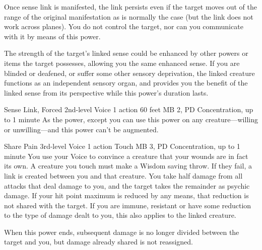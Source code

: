 Once sense link is manifested, the link persists
even if the target moves out of the range
of the original manifestation as is normally the case
(but the link does not work across planes).
You do not control the target,
nor can you communicate with it by means of this power.

The strength of the target's linked sense could be enhanced
by other powers or items the target possesses,
allowing you the same enhanced sense.
If you are blinded or deafened, or suffer some other sensory deprivation,
the linked creature functions as an independent sensory organ,
and provides you the benefit of the linked sense from its perspective
while this power's duration lasts.

\DndPowerHeader%
  {Sense Link, Forced}
  {2nd-level Voice}
  {1 action}
  {60 feet}
  {MB 2, PD \lvltwo}
  {Concentration, up to 1 minute}
As the  power,
except you can use this power on any creature---willing or
unwilling---and this power can't be augmented.

\DndPowerHeader%
  {Share Pain}
  {3rd-level Voice}
  {1 action}
  {Touch}
  {MB 3, PD \lvlthree}
  {Concentration, up to 1 minute}
You use your Voice to convince a creature that your wounds are
in fact its own.
A creature you touch must make a Wisdom saving throw.
If they fail, a link is created between you and that creature.
You take half damage from all attacks that deal damage to you,
and the target takes the remainder as psychic damage.
If your hit point maximum is reduced by any means,
that reduction is not shared with the target.
If you are immune, resistant or have some reduction
to the type of damage dealt to you,
this also applies to the linked creature. 

When this power ends,
subsequent damage is no longer divided between the target and you,
but damage already shared is not reassigned.

